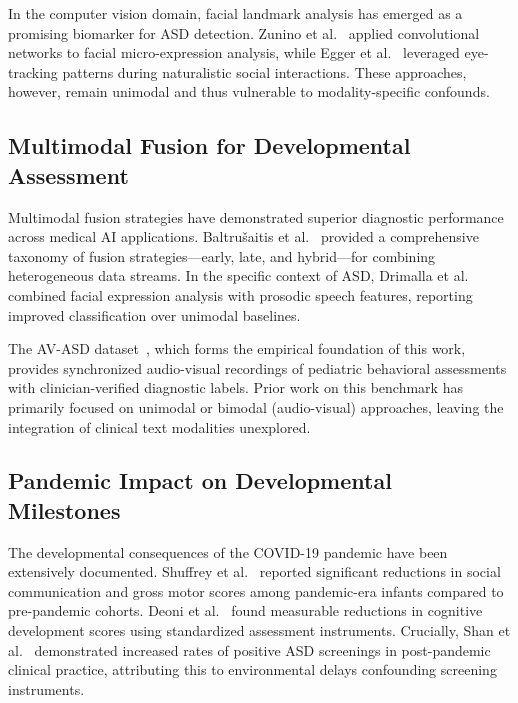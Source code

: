 \documentclass[conference]{IEEEtran}
\begin{document}
In the computer vision domain, facial landmark analysis has emerged as a promising biomarker for ASD detection. Zunino et al.~\cite{zunino2018video} applied convolutional networks to facial micro-expression analysis, while Egger et al.~\cite{egger2018automatic} leveraged eye-tracking patterns during naturalistic social interactions. These approaches, however, remain unimodal and thus vulnerable to modality-specific confounds.

\subsection{Multimodal Fusion for Developmental Assessment}

Multimodal fusion strategies have demonstrated superior diagnostic performance across medical AI applications. Baltru\v{s}aitis et al.~\cite{baltrusaitis2019multimodal} provided a comprehensive taxonomy of fusion strategies---early, late, and hybrid---for combining heterogeneous data streams. In the specific context of ASD, Drimalla et al.~\cite{drimalla2020towards} combined facial expression analysis with prosodic speech features, reporting improved classification over unimodal baselines.

The AV-ASD dataset~\cite{avasd2023}, which forms the empirical foundation of this work, provides synchronized audio-visual recordings of pediatric behavioral assessments with clinician-verified diagnostic labels. Prior work on this benchmark has primarily focused on unimodal or bimodal (audio-visual) approaches, leaving the integration of clinical text modalities unexplored.

\subsection{Pandemic Impact on Developmental Milestones}

The developmental consequences of the COVID-19 pandemic have been extensively documented. Shuffrey et al.~\cite{shuffrey2022association} reported significant reductions in social communication and gross motor scores among pandemic-era infants compared to pre-pandemic cohorts. Deoni et al.~\cite{deoni2021impact} found measurable reductions in cognitive development scores using standardized assessment instruments. Crucially, Shan et al.~\cite{shan2021covid} demonstrated increased rates of positive ASD screenings in post-pandemic clinical practice, attributing this to environmental delays confounding screening instruments.
\end{document}
